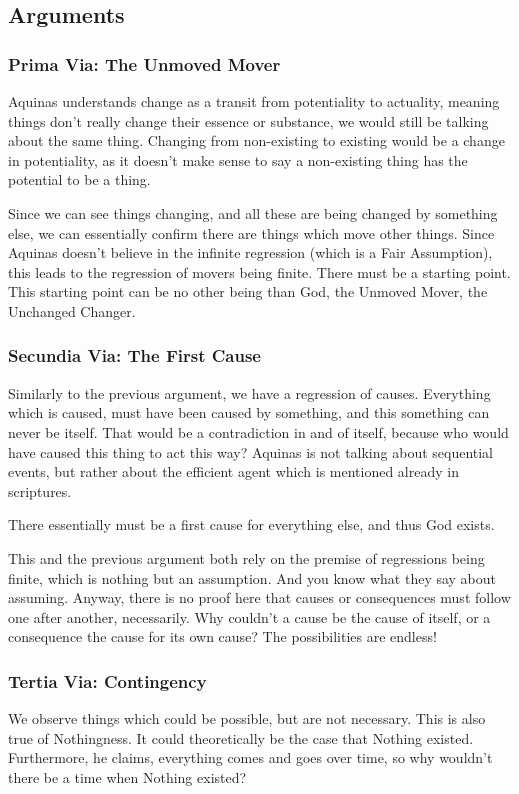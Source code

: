 \documentclass{article}
\begin{document}
	\subsection*{Arguments}
	\subsubsection*{Prima Via: The Unmoved Mover}
	Aquinas understands change as a transit from potentiality to actuality, meaning things don't really change their essence or substance, we would still be talking about the same thing. Changing from non-existing to existing would be a change in potentiality, as it doesn't make sense to say a non-existing thing has the potential to be a thing.

	Since we can see things changing, and all these are being changed by something else, we can essentially confirm there are things which move other things. Since Aquinas doesn't believe in the infinite regression (which is a Fair Assumption), this leads to the regression of movers being finite. There must be a starting point. This starting point can be no other being than God, the Unmoved Mover, the Unchanged Changer.


	\subsubsection*{Secundia Via: The First Cause}
	Similarly to the previous argument, we have a regression of causes. Everything which is caused, must have been caused by something, and this something can never be itself. That would be a contradiction in and of itself, because who would have caused this thing to act this way? Aquinas is not talking about sequential events, but rather about the efficient agent which is mentioned already in \citeauthor{aristotlecauses} scriptures.

	There essentially must be a first cause for everything else, and thus God exists.

	This and the previous argument both rely on the premise of regressions being finite, which is nothing but an assumption. And you know what they say about assuming. Anyway, there is no proof here that causes or consequences must follow one after another, necessarily. Why couldn't a cause be the cause of itself, or a consequence the cause for its own cause? The possibilities are endless!


	\subsubsection*{Tertia Via: Contingency}
	We observe things which could be possible, but are not necessary. This is also true of Nothingness. It could theoretically be the case that Nothing existed. Furthermore, he claims, everything comes and goes over time, so why wouldn't there be a time when Nothing existed?
	
\end{document}
